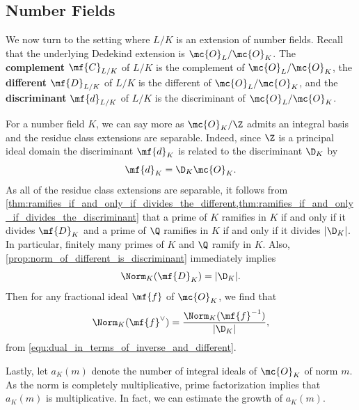 \documentclass[12pt]{article}
\begin{document}
      \subsection*{Number Fields}
        We now turn to the setting where \(L/K\) is an extension of number fields. Recall that the underlying Dedekind extension is \(\mc{O}_{L}/\mc{O}_{K}\). The \textbf{complement} \(\mf{C}_{L/K}\) of \(L/K\) is the complement of \(\mc{O}_{L}/\mc{O}_{K}\), the \textbf{different} \(\mf{D}_{L/K}\) of \(L/K\) is the different of \(\mc{O}_{L}/\mc{O}_{K}\), and the \textbf{discriminant} \(\mf{d}_{L/K}\) of \(L/K\) is the discriminant of \(\mc{O}_{L}/\mc{O}_{K}\).
        
        For a number field \(K\), we can say more as \(\mc{O}_{K}/\Z\) admits an integral basis and the residue class extensions are separable. Indeed, since \(\Z\) is a principal ideal domain the discriminant \(\mf{d}_{K}\) is related to the discriminant \(\D_{K}\) by
        \[
          \mf{d}_{K} = \D_{K}\mc{O}_{K}.
        \]
        As all of the residue class extensions are separable, it follows from \cref{thm:ramifies_if_and_only_if_divides_the_different,thm:ramifies_if_and_only_if_divides_the_discriminant} that a prime of \(K\) ramifies in \(K\) if and only if it divides \(\mf{D}_{K}\) and a prime of \(\Q\) ramifies in \(K\) if and only if it divides \(|\D_{K}|\). In particular, finitely many primes of \(K\) and \(\Q\) ramify in \(K\). Also, \cref{prop:norm_of_different_is_discriminant} immediately implies 
        \[
          \Norm_{K}(\mf{D}_{K}) = |\D_{K}|.
        \]
        Then for any fractional ideal \(\mf{f}\) of \(\mc{O}_{K}\), we find that
        \[
          \Norm_{K}(\mf{f}^{\vee}) = \frac{\Norm_{K}(\mf{f}^{-1})}{|\D_{K}|},
        \]
        from \cref{equ:dual_in_terms_of_inverse_and_different}.
        
        Lastly, let \(a_{K}(m)\) denote the number of integral ideals of \(\mc{O}_{K}\) of norm \(m\). As the norm is completely multiplicative, prime factorization implies that \(a_{K}(m)\) is multiplicative. In fact, we can estimate the growth of \(a_{K}(m)\).
\end{document}
